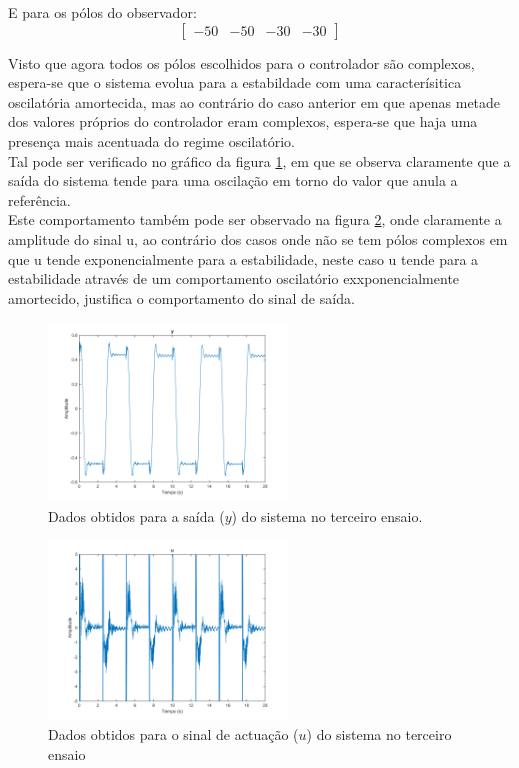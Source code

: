 \documentclass[%
  reprint,
  nofootinbib,
  amsmath,amssymb,
  aps,
  10pt,
  a4paper
]{revtex4-1}
\begin{document}
E para os pólos do observador:
\begin{equation}
\begin{bmatrix}
-50 & -50  & -30 &-30
\end{bmatrix}
\end{equation}

Visto que agora todos os pólos escolhidos para o controlador são complexos, espera-se que o sistema evolua para a estabildade com uma caracterísitica oscilatória amortecida, mas  ao contrário do caso anterior em que apenas metade dos valores próprios do controlador eram complexos, espera-se que haja uma presença mais acentuada do regime oscilatório.\\

Tal pode ser verificado no gráfico da figura \ref{fig:y_e}, em que se observa claramente que a saída do sistema tende para uma oscilação em torno do valor que anula a referência.\\

Este comportamento também pode ser observado na figura \ref{fig:u_e}, onde claramente a amplitude do sinal u, ao contrário dos casos onde não se tem pólos complexos em que u tende exponencialmente para a estabilidade, neste caso u tende para a estabilidade através de um comportamento oscilatório exxponencialmente amortecido, justifica o comportamento do sinal de saída.

\begin{figure}[t]
\includegraphics[width=2.5in]{../imgs/dados_00_e/dados_00_e_y.png}
\caption{Dados obtidos para a saída ($y$) do sistema no terceiro ensaio.}
\label{fig:y_e}
\end{figure}
\begin{figure}[t]
\includegraphics[width=2.5in]{../imgs/dados_00_e/dados_00_e_u.png}
\caption{Dados obtidos para o sinal de actuação ($u$) do sistema no terceiro ensaio}
\label{fig:u_e}
\end{figure}
\end{document}
